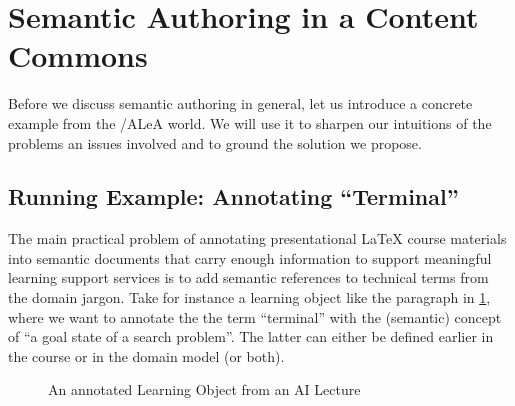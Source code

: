 \documentclass{llncs}
\newcommand\ALeA{\textsf{ALeA}\xspace}
\begin{document}
\section{Semantic Authoring in a Content Commons}

Before we discuss semantic authoring in general, let us introduce a concrete example from
the \sTeX/\ALeA world. We will use it to sharpen our intuitions of the problems an issues
involved and to ground the solution we propose.

\subsection{Running Example: Annotating  ``Terminal''}

The main practical problem of annotating presentational {\LaTeX} course materials into
semantic documents that carry enough information to support meaningful learning support
services is to add semantic references to technical terms from the domain jargon. Take for
instance a learning object like the paragraph in \cref{fig:lo}, where we want to annotate
the the term ``terminal'' with the (semantic) concept of ``a goal state of a search
problem''. The latter can either be defined earlier in the course or in the domain model
(or both).

\begin{figure}[ht]\centering
  \caption{An annotated Learning Object from an AI Lecture}\label{fig:lo}
\end{figure}
\end{document}
